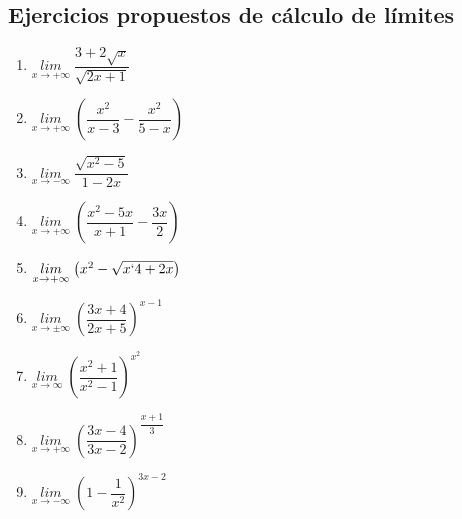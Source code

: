 	\subsection{Ejercicios propuestos de cálculo de límites}
	
	\begin{multicols}{2}
	\begin{enumerate}
		\item $\underset{x\to +\infty}{lim}\;{\dfrac{3+2\sqrt{x}}{\sqrt{2x+1}}}$
		 
		
		\item $\underset{x \to +\infty}{lim}\;{\left(\dfrac{x^2}{x-3}-\dfrac{x^2}{5-x}  \right)}$
		 
		\rightline{\textcolor{gris}{Solución: $-\infty$}}
		
		\item $\underset{x\to -\infty}{lim}\;{\dfrac{\sqrt{x^2-5}}{1-2x}}$
		
		\rightline{\textcolor{gris}{Solución: $1/2$}}
		
		 \item $\underset{x\to +\infty}{lim}\;{\left(\dfrac{x^2-5x}{x+1}-\dfrac{3x}{2} \right)}$
		
		\rightline{\textcolor{gris}{Solución: $-\infty$}}
		
		\item $\underset{x\to +\infty}{lim}\;{\left( x^2-\sqrt{x`4+2x} \right)}$
		
		\rightline{\textcolor{gris}{Solución: $0$}}
		
		\item $\underset{x\to \pm\infty}{lim}\;{\left(  \dfrac {3x+4}{2x+5}\right)^{x-1}}$
		
		\rightline{\textcolor{gris}{Solución: $\infty;\; 0$}}
		
		\item $\underset{x\to \infty}{lim}\;{\left( \dfrac {x^2+1}{x^2-1} \right) ^{x^2}}$
		
		\rightline{\textcolor{gris}{Solución: $e^2$}}
		
		\item $\underset{x\to +\infty}{lim}\;{\left( \dfrac {3x-4}{3x-2} \right) ^{\dfrac {x+1}{3}}}$
		
		
		\item $\underset{x\to -\infty}{lim}\;{\left( 1-\dfrac{1}{x^2}\right)^{3x-2}}$
		

\end{enumerate}
\end{multicols}
